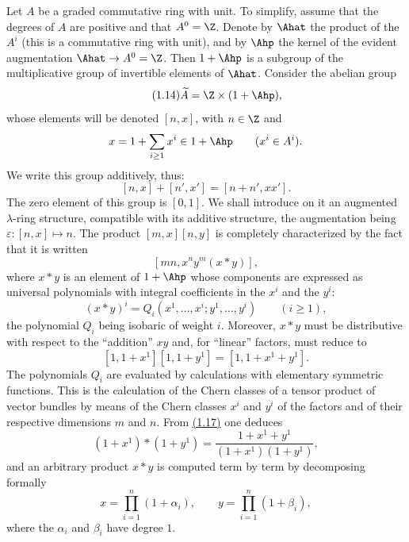 Let $A$ be a graded commutative ring with unit. To simplify, assume that the degrees of $A$ are positive and that $A^0=\Z$. Denote by $\Ahat$ the product of the $A^i$ (this is a commutative ring with unit), and by $\Ahp$ the kernel of the evident augmentation $\Ahat\to A^0=\Z$. Then $1+\Ahp$ is a subgroup of the multiplicative group of invertible elements of $\Ahat$. Consider the abelian group
\begin{equation}\tag{1.14}
\widetilde A=\Z\times (1+\Ahp),
\end{equation}
whose elements will be denoted $[n,x]$, with $n\in\Z$ and
\[
x=1+\sum_{i\geq 1}x^i\in 1+\Ahp\qquad (x^i\in A^i).
\]
We write this group additively, thus:
\begin{equation}\tag{1.15}
[n,x]+[n',x']=[n+n',xx'].
\end{equation}
The zero element of this group is $[0,1]$. We shall introduce on it an augmented $\lambda$-ring structure, compatible with its additive structure, the augmentation being $\varepsilon:[n,x]\mapsto n$. The product $[m,x][n,y]$ is completely characterized by the fact that it is written
\[
[mn,x^n y^m(x*y)],
\]
where $x*y$ is an element of $1+\Ahp$ whose components are expressed as universal polynomials with integral coefficients in the $x^i$ and the $y^i$:
\begin{equation}\tag{1.16}
(x*y)^i=Q_i(x^1,\ldots,x^i;y^1,\ldots,y^i)\qquad (i\geq 1),
\end{equation}
the polynomial $Q_i$ being isobaric of weight $i$. Moreover, $x*y$ must be distributive with respect to the ``addition'' $xy$ and, for ``linear'' factors, must reduce to
\begin{equation}\tag{1.17}
[1,1+x^1][1,1+y^1]=[1,1+x^1+y^1].
\end{equation}
The polynomials $Q_i$ are evaluated by calculations with elementary symmetric functions. This is the calculation of the Chern classes of a tensor product of vector bundles by means of the Chern classes $x^i$ and $y^i$ of the factors and of their respective dimensions $m$ and $n$. From \hyperlink{sga6.e00.eq.1-17}{(1.17)} one deduces
\begin{equation}\tag{1.17 bis}
(1+x^1)*(1+y^1)=\frac{1+x^1+y^1}{(1+x^1)(1+y^1)},
\end{equation}
and an arbitrary product $x*y$ is computed term by term by decomposing formally
\[
x=\prod_{i=1}^n(1+\alpha_i),\qquad y=\prod_{i=1}^n(1+\beta_i),
\]
where the $\alpha_i$ and $\beta_i$ have degree $1$.

